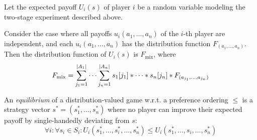 \documentclass[a4paper]{scrreprt}
\DeclareMathOperator{\A}{\mathcal{A}}
\DeclareMathOperator{\RVs}{\mathcal{D}}
\begin{document}
    \begin{defn}[Expected Payoff]
        
        
        Let the expected payoff $U_i(s)$ of player $i$ be a random variable modeling the two-stage experiment described above.
    \end{defn}

    \begin{lemma}
        Consider the case where all payoffs $u_i(a_1, \dots, a_n)$ of the $i$-th player are independent, and each $u_i(a_1, \dots, a_n)$ has the distribution function $F_{(a_1, \dots, a_n)}$.
        Then the distribution function of $U_i(s)$ is $F_{\text{mix}}$, where
        \begin{equation}
            F_{\text{mix}} = \sum_{j_1=1}^{\left| A_1 \right|} \dots \sum_{j_n=1}^{\left| A_n \right|} s_1[j_1] * \dots * s_n[j_n] * F_{(a_{j_1}, \dots, a_{j_n})}
        \end{equation}
    \end{lemma}
    
    
    \begin{defn}
        An \emph{equilibrium} of a distribution-valued game  w.r.t. a preference ordering $\leqslant$ is a strategy vector $s^\ast = (s_1^\ast, \dots, s_n^\ast)$ where no player can improve their expected payoff by single-handedly deviating from $s$:
        \begin{equation}
            \forall i: \forall s_i \in S_i: U_i(s_1^\ast, \dots, s_i^\ast, \dots, s_n^\ast) \leqslant U_i(s_1^\ast, \dots, s_i, \dots, s_n^\ast)
        \end{equation}
    \end{defn}
    
\end{document}
